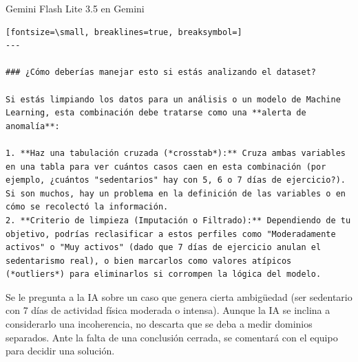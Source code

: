 \documentclass[12pt,a4paper,oneside]{book}
\begin{document}
\begin{iaresp}{Gemini Flash Lite 3.5 en Gemini}
\begin{Verbatim}[fontsize=\small, breaklines=true, breaksymbol=]
---

### ¿Cómo deberías manejar esto si estás analizando el dataset?

Si estás limpiando los datos para un análisis o un modelo de Machine Learning, esta combinación debe tratarse como una **alerta de anomalía**:

1. **Haz una tabulación cruzada (*crosstab*):** Cruza ambas variables en una tabla para ver cuántos casos caen en esta combinación (por ejemplo, ¿cuántos "sedentarios" hay con 5, 6 o 7 días de ejercicio?). Si son muchos, hay un problema en la definición de las variables o en cómo se recolectó la información.
2. **Criterio de limpieza (Imputación o Filtrado):** Dependiendo de tu objetivo, podrías reclasificar a estos perfiles como "Moderadamente activos" o "Muy activos" (dado que 7 días de ejercicio anulan el sedentarismo real), o bien marcarlos como valores atípicos (*outliers*) para eliminarlos si corrompen la lógica del modelo.
\end{Verbatim}
\end{iaresp}
\begin{iaanalisis}
Se le pregunta a la IA sobre un caso que genera cierta ambigüedad (ser sedentario con 7 días de actividad física moderada o intensa). Aunque la IA se inclina a considerarlo una incoherencia, no descarta que se deba a medir dominios separados. Ante la falta de una conclusión cerrada, se comentará con el equipo para decidir una solución.
\end{iaanalisis}
\end{document}
